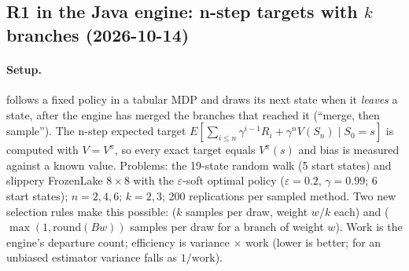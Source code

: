 
\subsection{R1 in the Java engine: n-step targets with $k$ branches (2026-10-14)}
\label{sec:java-nstep}


\paragraph{Setup.}  follows a fixed policy in a tabular MDP and draws its next state when it
\emph{leaves} a state, after the engine has merged the branches that reached it (``merge, then sample''). The n-step
expected target $E[\sum_{i\le n}\gamma^{i-1}R_i+\gamma^n V(S_n)\mid S_0=s]$ is computed with $V=V^\pi$, so every exact
target equals $V^\pi(s)$ and bias is measured against a known value. Problems: the 19-state random walk (5 start states)
and slippery FrozenLake $8\times8$ with the $\varepsilon$-soft optimal policy ($\varepsilon=0.2$, $\gamma=0.99$; 6 start
states); $n=2,4,6$; $k=2,3$; 200 replications per sampled method. Two new selection rules make this possible:
 ($k$ samples per draw, weight $w/k$ each) and 
($\max(1,\mathrm{round}(Bw))$ samples per draw for a branch of weight $w$). Work is the engine's departure count;
efficiency is variance $\times$ work (lower is better; for an unbiased estimator variance falls as $1/\text{work}$).


